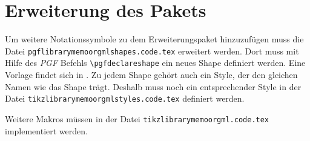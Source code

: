 %     
%     
%     
%     
%     
%     
%     
%     
%     


\section{Erweiterung des Pakets}
\label{sec:Erweiterung}
Um weitere Notationssymbole zu dem Erweiterungspaket hinzuzufügen muss die Datei \texttt{pgflibrarymemoorgmlshapes.code.tex} erweitert werden. Dort muss mit Hilfe des \textit{PGF} Befehls \lstinline|\pgfdeclareshape| ein neues Shape definiert werden. Eine Vorlage findet sich in \cite[][S. 1034]{Tantau:Tikz}. Zu jedem Shape gehört auch ein Style, der den gleichen Namen wie das Shape trägt. Deshalb muss noch ein entsprechender Style in der Datei \texttt{tikzlibrarymemoorgmlstyles.code.tex} definiert werden.\medskip

\noindent Weitere Makros müssen in der Datei \texttt{tikzlibrarymemoorgml.code.tex} implementiert werden.





